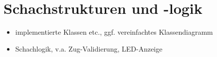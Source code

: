 
\section{Schachstrukturen und -logik}
\label{sec:chess-logic}

\begin{itemize}
    \item implementierte Klassen etc., ggf. vereinfachtes Klassendiagramm
    \item Schachlogik, v.a. Zug-Validierung, LED-Anzeige
\end{itemize}
